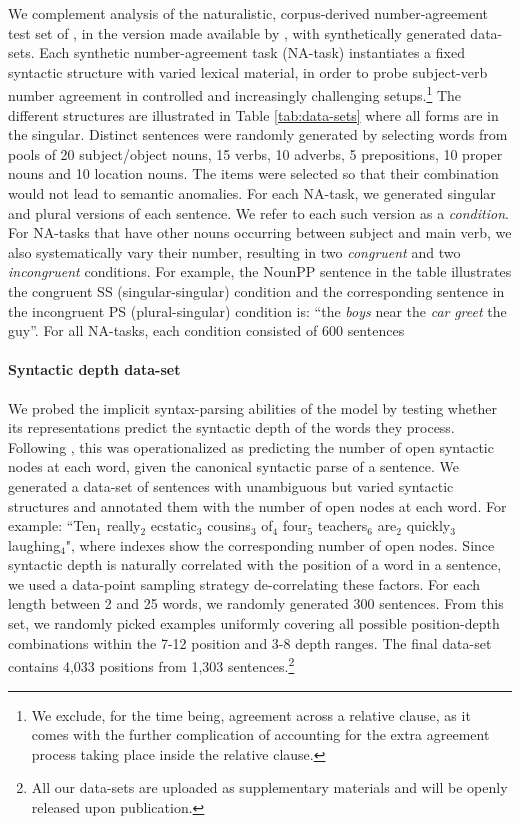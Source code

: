 We complement analysis of the naturalistic, corpus-derived
number-agreement test set of , in the
version made available by , with
synthetically generated data-sets. Each synthetic number-agreement
task (NA-task) instantiates a fixed syntactic structure with varied
lexical material, in order to probe subject-verb number agreement in
controlled and increasingly challenging setups.\footnote{We exclude,
  for the time being, agreement across a relative clause, as it comes
  with the further complication of accounting for the extra agreement
  process taking place inside the relative clause.} The different
structures are illustrated in Table \ref{tab:data-sets} where all forms are in the singular. Distinct sentences were randomly
generated by selecting words from pools of 20
subject/object nouns, 15 verbs, 10 adverbs, 5 prepositions, 10 proper
nouns and 10 location nouns. The items were selected so that their
combination would not lead to semantic anomalies. For each NA-task, we
generated singular and plural versions of each sentence. We refer to
each such version as a \textit{condition}. For NA-tasks that have
other nouns occurring between subject and main verb, we also
systematically vary their number, resulting in two \textit{congruent}
and two \textit{incongruent} conditions. For example, the NounPP
sentence in the table illustrates the congruent SS (singular-singular)
condition and the corresponding sentence in the incongruent PS
(plural-singular) condition is: ``the \emph{boys} near the \emph{car}
\emph{greet} the guy''. For all NA-tasks, each condition consisted of
600 sentences

\paragraph{Syntactic depth data-set} We probed the implicit
syntax-parsing abilities of the model by testing whether its representations
predict the syntactic depth of the words they process. Following
, this was operationalized as predicting the
number of open syntactic nodes at each word, given the canonical
syntactic parse of a sentence.  We generated a data-set of sentences with
unambiguous but varied syntactic structures and annotated them with the number of open nodes at each word. For example:
``Ten$_1$ really$_2$ ecstatic$_3$ cousins$_3$ of$_4$ four$_5$ teachers$_6$
are$_2$ quickly$_3$ laughing$_4$", where indexes show the corresponding
number of open nodes.
Since syntactic depth is
naturally correlated with the position of a word in a sentence, we
used a data-point sampling strategy de-correlating these factors. For
each length between 2 and 25 words, we randomly generated 300
sentences. From this set, we randomly picked examples uniformly
covering all possible position-depth combinations within the 7-12
position and 3-8 depth ranges. The final data-set contains 4,033
positions from 1,303 sentences.\footnote{All our data-sets are
  uploaded as supplementary materials and will be openly released upon
  publication.}